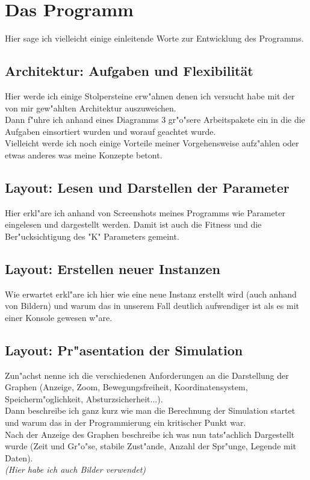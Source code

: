 \documentclass[11pt, a4paper, german]{article}
\begin{document}
\clearpage
\section{Das Programm}
Hier sage ich vielleicht einige einleitende Worte zur Entwicklung des Programms.

	\subsection{Architektur: Aufgaben und Flexibilität}
	Hier werde ich einige Stolpersteine erw"ahnen denen ich versucht habe mit der von mir gew"ahlten Architektur auszuweichen.\\
	Dann f"uhre ich anhand eines Diagramms 3 gr"o"sere Arbeitspakete ein in die die Aufgaben einsortiert wurden und worauf geachtet wurde.\\
	Vielleicht werde ich noch einige Vorteile meiner Vorgehensweise aufz"ahlen oder etwas anderes was meine Konzepte betont.
	
	\subsection{Layout: Lesen und Darstellen der Parameter}
	Hier erkl"are ich anhand von Screenshots meines Programms wie Parameter eingelesen und dargestellt werden. Damit ist auch die Fitness und die Ber"ucksichtigung des "{}K"{} Parameters gemeint.
	
	\subsection{Layout: Erstellen neuer Instanzen}
	Wie erwartet erkl"are ich hier wie eine neue Instanz erstellt wird (auch anhand von Bildern) und warum das in unserem Fall deutlich aufwendiger ist als es mit einer Konsole gewesen w"are.
	
	\subsection{Layout: Pr"asentation der Simulation}
	Zun"achst nenne ich die verschiedenen Anforderungen an die Darstellung der Graphen (Anzeige, Zoom, Bewegungsfreiheit, Koordinatensystem, Speicherm"oglichkeit, Absturzsicherheit...).\\
	Dann beschreibe ich ganz kurz wie man die Berechnung der Simulation startet und warum das in der Programmierung ein kritischer Punkt war.\\
	Nach der Anzeige des Graphen beschreibe ich was nun tats"achlich Dargestellt wurde (Zeit und Gr"o"se, stabile Zust"ande, Anzahl der Spr"unge, Legende mit Daten).\\
	\textit{(Hier habe ich auch Bilder verwendet)}
\end{document}
